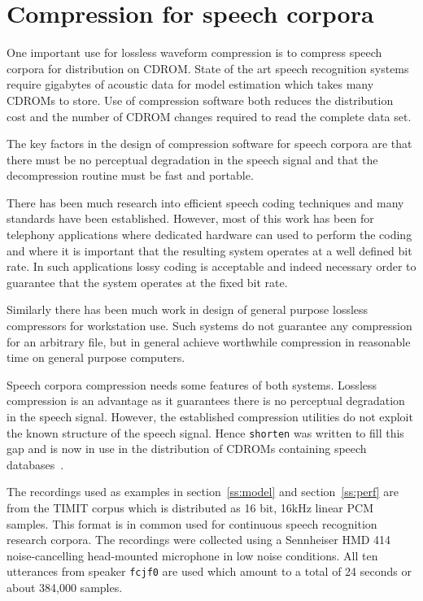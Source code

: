 \section{Compression for speech corpora}

One important use for lossless waveform compression is to compress
speech corpora for distribution on CDROM.  State of the art speech
recognition systems require gigabytes of acoustic data for model
estimation which takes many CDROMs to store.  Use of compression
software both reduces the distribution cost and the number of CDROM
changes required to read the complete data set.

The key factors in the design of compression software for speech corpora
are that there must be no perceptual degradation in the speech signal
and that the decompression routine must be fast and portable.

There has been much research into efficient speech coding techniques and
many standards have been established.  However, most of this work has
been for telephony applications where dedicated hardware can used to
perform the coding and where it is important that the resulting system
operates at a well defined bit rate.  In such applications lossy coding
is acceptable and indeed necessary order to guarantee that the system
operates at the fixed bit rate.

Similarly there has been much work in design of general purpose lossless
compressors for workstation use.  Such systems do not guarantee any
compression for an arbitrary file, but in general achieve worthwhile
compression in reasonable time on general purpose computers.

Speech corpora compression needs some features of both systems.
Lossless compression is an advantage as it guarantees there is no
perceptual degradation in the speech signal.  However, the established
compression utilities do not exploit the known structure of the speech
signal.  Hence {\tt shorten} was written to fill this gap and is now in
use in the distribution of CDROMs containing speech
databases~\cite{GarofoloRobinsonFiscus94}.

The recordings used as examples in section~\ref{ss:model} and
section~\ref{ss:perf} are from the TIMIT corpus which is distributed as
16 bit, 16kHz linear PCM samples.  This format is in common used for
continuous speech recognition research corpora.  The recordings were
collected using a Sennheiser HMD 414 noise-cancelling head-mounted
microphone in low noise conditions.  All ten utterances from speaker
{\tt fcjf0} are used which amount to a total of 24 seconds or about
384,000 samples.

